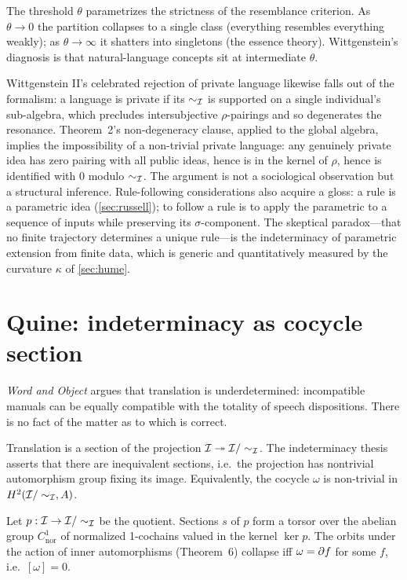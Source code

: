 \litcomment The threshold $\theta$ parametrizes the strictness of the
resemblance criterion. As $\theta\to 0$ the partition collapses to a
single class (everything resembles everything weakly); as $\theta\to
\infty$ it shatters into singletons (the essence theory). Wittgenstein's
diagnosis is that natural-language concepts sit at intermediate
$\theta$.

Wittgenstein II's celebrated rejection of private language likewise
falls out of the formalism: a language is private if its $\sim_{\mathcal{I}}$
is supported on a single individual's sub-algebra, which precludes
intersubjective $\rho$-pairings and so degenerates the resonance.
Theorem~2's non-degeneracy clause, applied to the global algebra,
implies the impossibility of a non-trivial private language: any
genuinely private idea has zero pairing with all public ideas, hence
is in the kernel of $\rho$, hence is identified with $0$ modulo
$\sim_{\mathcal{I}}$. The argument is not a sociological observation but a
structural inference. Rule-following considerations also acquire a
gloss: a rule is a parametric idea (\cref{sec:russell}); to follow a
rule is to apply the parametric to a sequence of inputs while
preserving its $\sigma$-component. The skeptical paradox---that no
finite trajectory determines a unique rule---is the indeterminacy of
parametric extension from finite data, which is generic and
quantitatively measured by the curvature $\kappa$ of \cref{sec:hume}.

\section{Quine: indeterminacy as cocycle section}\label{sec:quine}

 \emph{Word and Object} \cite{Quine1960}
argues that translation is underdetermined: incompatible manuals can be
equally compatible with the totality of speech dispositions. There is
no fact of the matter as to which is correct.

\formalclaim Translation is a section of the projection
$\mathcal{I}\twoheadrightarrow\mathcal{I}/\sim_{\mathcal{I}}$. The indeterminacy thesis
asserts that there are inequivalent sections, i.e.\ the projection has
nontrivial automorphism group fixing its image. Equivalently, the
cocycle $\omega$ is non-trivial in $H^2(\mathcal{I}/\sim_{\mathcal{I}}, A)$.

\begin{lemma}\label{lem:quine}
Let $p:\mathcal{I}\to\mathcal{I}/\sim_{\mathcal{I}}$ be the quotient. Sections $s$ of $p$
form a torsor over the abelian group $C^1_{\mathrm{nor}}$ of normalized
1-cochains valued in the kernel $\ker p$. The orbits under the action
of inner automorphisms (Theorem~6) collapse iff $\omega = \partial f$ for
some $f$, i.e.\ $[\omega] = 0$.
\end{lemma}

